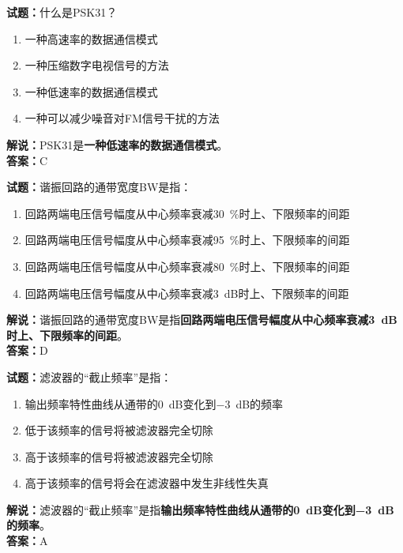 \documentclass{ctexbook}
\begin{document}
\vspace{1em}

\textbf{试题：}什么是PSK31？
\begin{enumerate}[leftmargin=3em]
  \item 一种高速率的数据通信模式
  \item 一种压缩数字电视信号的方法
  \item 一种低速率的数据通信模式
  \item 一种可以减少噪音对FM信号干扰的方法
\end{enumerate}
\noindent\textbf{解说：}PSK31是\textbf{一种低速率的数据通信模式}。\\\noindent\textbf{答案：}C

\vspace{1em}

\textbf{试题：}谐振回路的通带宽度BW是指：
\begin{enumerate}[leftmargin=3em]
  \item 回路两端电压信号幅度从中心频率衰减\qty{30}{\percent}时上、下限频率的间距
  \item 回路两端电压信号幅度从中心频率衰减\qty{95}{\percent}时上、下限频率的间距
  \item 回路两端电压信号幅度从中心频率衰减\qty{80}{\percent}时上、下限频率的间距
  \item 回路两端电压信号幅度从中心频率衰减\SI{3}{\dB}时上、下限频率的间距
\end{enumerate}
\noindent\textbf{解说：}谐振回路的通带宽度BW是指\textbf{回路两端电压信号幅度从中心频率衰减\SI{3}{\dB}时上、下限频率的间距}。\\\noindent\textbf{答案：}D

\vspace{1em}

\textbf{试题：}滤波器的“截止频率”是指：
\begin{enumerate}[leftmargin=3em]
  \item 输出频率特性曲线从通带的\SI{0}{\dB}变化到\SI{-3}{\dB}的频率
  \item 低于该频率的信号将被滤波器完全切除
  \item 高于该频率的信号将被滤波器完全切除
  \item 高于该频率的信号将会在滤波器中发生非线性失真
\end{enumerate}
\noindent\textbf{解说：}滤波器的“截止频率”是指\textbf{输出频率特性曲线从通带的\SI{0}{\dB}变化到\SI{-3}{\dB}的频率}。\\\noindent\textbf{答案：}A

\vspace{1em}
\end{document}
